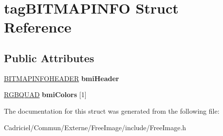 \hypertarget{structtag_b_i_t_m_a_p_i_n_f_o}{}\section{tag\+B\+I\+T\+M\+A\+P\+I\+N\+FO Struct Reference}
\label{structtag_b_i_t_m_a_p_i_n_f_o}
\subsection*{Public Attributes}
\begin{DoxyCompactItemize}
\item 
\hyperlink{structtag_b_i_t_m_a_p_i_n_f_o_h_e_a_d_e_r}{B\+I\+T\+M\+A\+P\+I\+N\+F\+O\+H\+E\+A\+D\+ER} {\bfseries bmi\+Header}\hypertarget{structtag_b_i_t_m_a_p_i_n_f_o_a1cbcd562dccbedec498b504f247405c3}{}\label{structtag_b_i_t_m_a_p_i_n_f_o_a1cbcd562dccbedec498b504f247405c3}

\item 
\hyperlink{structtag_r_g_b_q_u_a_d}{R\+G\+B\+Q\+U\+AD} {\bfseries bmi\+Colors} \mbox{[}1\mbox{]}\hypertarget{structtag_b_i_t_m_a_p_i_n_f_o_a5a9747ecf91e36b60469f6483ec1980e}{}\label{structtag_b_i_t_m_a_p_i_n_f_o_a5a9747ecf91e36b60469f6483ec1980e}

\end{DoxyCompactItemize}


The documentation for this struct was generated from the following file\+:\begin{DoxyCompactItemize}
\item 
Cadriciel/\+Commun/\+Externe/\+Free\+Image/include/Free\+Image.\+h\end{DoxyCompactItemize}
